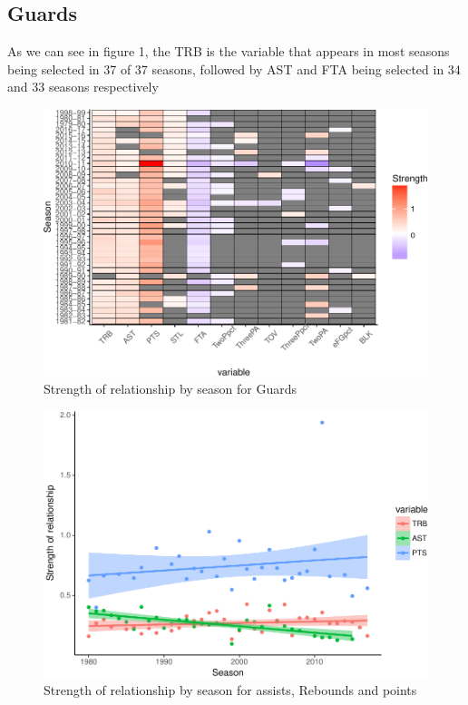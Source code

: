 \documentclass[]{elsarticle} %
\makeatletter
\def\maxwidth{\ifdim\Gin@nat@width>\linewidth\linewidth
\else\Gin@nat@width\fi}
\let\Oldincludegraphics\includegraphics
\renewcommand{\includegraphics}[1]{\Oldincludegraphics[width=\maxwidth]{#1}}
\makeatother
\begin{document}
\subsection{Guards}\label{guards}

As we can see in figure 1, the TRB is the variable that appears in most
seasons being selected in 37 of 37 seasons, followed by AST and FTA
being selected in 34 and 33 seasons respectively

\begin{figure}[htbp]
\centering
\includegraphics{Coaching_Selection_files/figure-latex/unnamed-chunk-12-1.pdf}
\caption{Strength of relationship by season for Guards}
\end{figure}

\begin{figure}[htbp]
\centering
\includegraphics{Coaching_Selection_files/figure-latex/unnamed-chunk-13-1.pdf}
\caption{Strength of relationship by season for assists, Rebounds and
points}
\end{figure}
\end{document}
